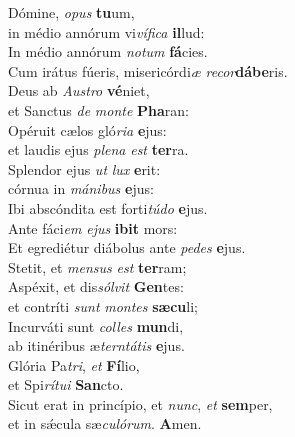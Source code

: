 \evenverse Dómine, \textit{o}\textit{pus} \textbf{tu}um,~\*\\
\evenverse in médio annórum vi\textit{ví}\textit{fi}\textit{ca} \textbf{il}lud:\\
\oddverse In médio annórum \textit{no}\textit{tum} \textbf{fá}cies.~\*\\
\oddverse Cum irátus fúeris, misericórdi\textit{æ} \textit{re}\textit{cor}\textbf{dá}\textbf{be}ris.\\
\evenverse Deus ab \textit{Au}\textit{stro} \textbf{vé}niet,~\*\\
\evenverse et Sanctus \textit{de} \textit{mon}\textit{te} \textbf{Pha}ran:\\
\oddverse Opéruit cælos gló\textit{ri}\textit{a} \textbf{e}jus:~\*\\
\oddverse et laudis ejus \textit{ple}\textit{na} \textit{est} \textbf{ter}ra.\\
\evenverse Splendor ejus \textit{ut} \textit{lux} \textbf{e}rit:~\*\\
\evenverse córnua in \textit{má}\textit{ni}\textit{bus} \textbf{e}jus:\\
\oddverse Ibi abscóndita est forti\textit{tú}\textit{do} \textbf{e}jus.~\*\\
\oddverse Ante fáci\textit{em} \textit{e}\textit{jus} \textbf{i}\textbf{bit} mors:\\
\evenverse Et egrediétur diábolus ante \textit{pe}\textit{des} \textbf{e}jus.~\*\\
\evenverse Stetit, et \textit{men}\textit{sus} \textit{est} \textbf{ter}ram;\\
\oddverse Aspéxit, et dis\textit{sól}\textit{vit} \textbf{Gen}tes:~\*\\
\oddverse et contríti \textit{sunt} \textit{mon}\textit{tes} \textbf{sæ}\textbf{cu}li;\\
\evenverse Incurváti sunt \textit{col}\textit{les} \textbf{mun}di,~\*\\
\evenverse ab itinéribus æ\textit{ter}\textit{ntá}\textit{tis} \textbf{e}jus.\\
\oddverse Glória Pa\textit{tri}, \textit{et} \textbf{Fí}lio,~\*\\
\oddverse et Spi\textit{rí}\textit{tu}\textit{i} \textbf{San}cto.\\
\evenverse Sicut erat in princípio, et \textit{nunc}, \textit{et} \textbf{sem}per,~\*\\
\evenverse et in sǽcula sæ\textit{cu}\textit{ló}\textit{rum}. \textbf{A}men.\\
